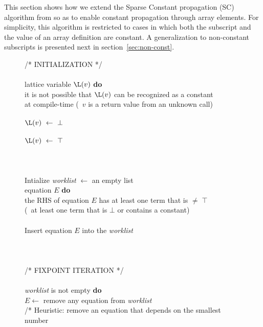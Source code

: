 This section shows how we extend the Sparse
Constant propagation (SC) algorithm from \cite{WZ91} so as to enable
constant propagation through array elements.
For simplicity, this algorithm is restricted
to cases in which both the subscript and the value of an
array definition are constant.  A generalization to non-constant
subscripts is presented next in section~\ref{sec:non-const}.


\begin{figure}
\begin{center}
\begin{programa}
/* INITIALIZATION */ \\
\\
 lattice variable $\L(v)$ {\bf do}\\
 it is not possible that $\L(v)$ can be recognized as a constant\\
\Td at compile-time (\eg\ $v$ is a return value from an unknown call)\\
\\
\Tc $\L(v)\  \leftarrow\ \bot $\\
\\
\Tc $\L(v)\  \leftarrow\ \top $\\
\\
\\
\\
\Ta Intialize {\it worklist} $\leftarrow$ an empty list\\
 equation $E$ {\bf do}\\
 the RHS of equation $E$ has at least one term that is $\not= \; \top$ \\
\Td  (\ie\ at least one term that is $\bot$ or contains a constant)\\
\\
\Tc  Insert equation $E$ into the {\it worklist}\\
\\
\\
 \\
/* FIXPOINT ITERATION */ \\
\\
 {\it worklist} is not empty {\bf do}\\
\Tb $E \leftarrow$ remove any equation from {\it worklist}\\
\Tb /* Heuristic: remove an equation that depends on the smallest number\\

\end{programa}
\end{center}
\end{figure}
